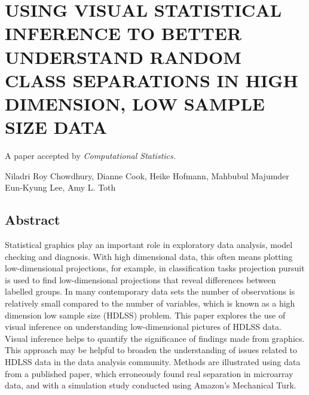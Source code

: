 
\chapter{USING VISUAL STATISTICAL INFERENCE TO BETTER UNDERSTAND RANDOM CLASS SEPARATIONS IN HIGH DIMENSION, LOW SAMPLE SIZE DATA}\label{ch:largepsmalln}
\vspace{0.8cm}
\begin{center}
\large{A paper accepted by \it{Computational Statistics}.}

\large{Niladri Roy Chowdhury, Dianne Cook, Heike Hofmann, Mahbubul Majumder}\\
\large{Eun-Kyung Lee, Amy L. Toth}
\end{center}

%
%


\section*{Abstract}
Statistical graphics play an important role in exploratory data analysis, model checking and diagnosis. With high dimensional data, this often means plotting low-dimensional projections, for example, in classification tasks projection pursuit is used to find low-dimensional projections that reveal differences between labelled groups. In many contemporary data sets the number of observations is relatively small compared to the number of variables, which is known as a high dimension low sample size (HDLSS) problem. This paper explores the use of visual inference on understanding low-dimensional pictures of HDLSS data. Visual inference helps to quantify the significance of findings made from graphics.  This approach may be helpful to broaden the understanding of issues related to HDLSS data in the data analysis community. Methods are illustrated using data from a published paper, which erroneously found real separation in microarray data, and with a simulation study conducted using Amazon's Mechanical Turk.

